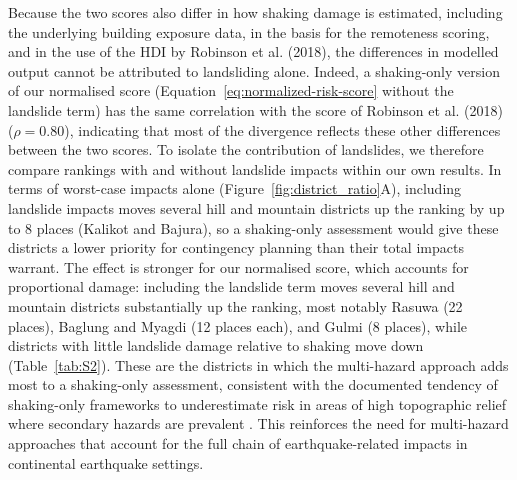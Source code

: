 \documentclass[preprint,12pt,authoryear]{elsarticle}
\begin{document}
Because the two scores also differ in how shaking damage is estimated, including the underlying building exposure data, in the basis for the remoteness scoring, and in the use of the HDI by Robinson et al. (2018), the differences in modelled output cannot be attributed to landsliding alone. Indeed, a shaking-only version of our normalised score (Equation~\ref{eq:normalized-risk-score} without the landslide term) has the same correlation with the score of Robinson et al. (2018) ($\rho = 0.80$), indicating that most of the divergence reflects these other differences between the two scores. To isolate the contribution of landslides, we therefore compare rankings with and without landslide impacts within our own results. In terms of worst-case impacts alone (Figure~\ref{fig:district_ratio}A), including landslide impacts moves several hill and mountain districts up the ranking by up to 8 places (Kalikot and Bajura), so a shaking-only assessment would give these districts a lower priority for contingency planning than their total impacts warrant. The effect is stronger for our normalised score, which accounts for proportional damage: including the landslide term moves several hill and mountain districts substantially up the ranking, most notably Rasuwa (22 places), Baglung and Myagdi (12 places each), and Gulmi (8 places), while districts with little landslide damage relative to shaking move down (Table~\ref{tab:S2}). These are the districts in which the multi-hazard approach adds most to a shaking-only assessment, consistent with the documented tendency of shaking-only frameworks to underestimate risk in areas of high topographic relief where secondary hazards are prevalent \citep{Budimir2014}. This reinforces the need for multi-hazard approaches that account for the full chain of earthquake-related impacts in continental earthquake settings.
\end{document}
